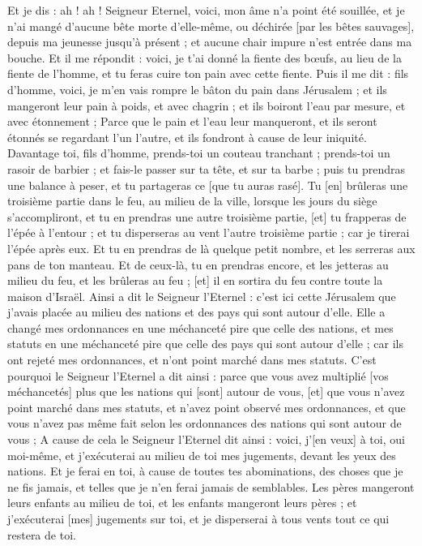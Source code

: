 \begin{multicols}{2}
Et je dis : ah ! ah ! Seigneur Eternel, voici, mon âme n'a point été souillée, et je n'ai mangé d'aucune bête morte d'elle-même, ou déchirée [par les bêtes sauvages], depuis ma jeunesse jusqu'à présent ; et aucune chair impure n'est entrée dans ma bouche.
Et il me répondit : voici, je t'ai donné la fiente des bœufs, au lieu de la fiente de l'homme, et tu feras cuire ton pain avec cette fiente.
Puis il me dit : fils d'homme, voici, je m'en vais rompre le bâton du pain dans Jérusalem ; et ils mangeront leur pain à poids, et avec chagrin ; et ils boiront l'eau par mesure, et avec étonnement ;
Parce que le pain et l'eau leur manqueront, et ils seront étonnés se regardant l'un l'autre, et ils fondront à cause de leur iniquité.
\VerseOne{}Davantage toi, fils d'homme, prends-toi un couteau tranchant ; prends-toi un rasoir de barbier ; et fais-le passer sur ta tête, et sur ta barbe ; puis tu prendras une balance à peser, et tu partageras ce [que tu auras rasé].
Tu [en] brûleras une troisième partie dans le feu, au milieu de la ville, lorsque les jours du siège s'accompliront, et tu en prendras une autre troisième partie, [et] tu frapperas de l'épée à l'entour ; et tu disperseras au vent l'autre troisième partie ; car je tirerai l'épée après eux.
Et tu en prendras de là quelque petit nombre, et les serreras aux pans de ton manteau.
Et de ceux-là, tu en prendras encore, et les jetteras au milieu du feu, et les brûleras au feu ; [et] il en sortira du feu contre toute la maison d'Israël.
Ainsi a dit le Seigneur l'Eternel : c'est ici cette Jérusalem que j'avais placée au milieu des nations et des pays qui sont autour d'elle.
Elle a changé mes ordonnances en une méchanceté pire que celle des nations, et mes statuts en une méchanceté pire que celle des pays qui sont autour d'elle ; car ils ont rejeté mes ordonnances, et n'ont point marché dans mes statuts.
C'est pourquoi le Seigneur l'Eternel a dit ainsi : parce que vous avez multiplié [vos méchancetés] plus que les nations qui [sont] autour de vous, [et] que vous n'avez point marché dans mes statuts, et n'avez point observé mes ordonnances, et que vous n'avez pas même fait selon les ordonnances des nations qui sont autour de vous ;
A cause de cela le Seigneur l'Eternel dit ainsi : voici, j'[en veux] à toi, oui moi-même, et j'exécuterai au milieu de toi mes jugements, devant les yeux des nations.
Et je ferai en toi, à cause de toutes tes abominations, des choses que je ne fis jamais, et telles que je n'en ferai jamais de semblables.
Les pères mangeront leurs enfants au milieu de toi, et les enfants mangeront leurs pères ; et j'exécuterai [mes] jugements sur toi, et je disperserai à tous vents tout ce qui restera de toi.

\end{multicols}
